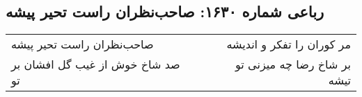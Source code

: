 \begin{center}
\section*{رباعی شماره ۱۶۳۰: صاحب‌نظران راست تحیر پیشه}
\label{sec:1630}
\begin{longtable}{l p{0.5cm} r}
صاحب‌نظران راست تحیر پیشه
&&
مر کوران را تفکر و اندیشه
\\
صد شاخ خوش از غیب گل افشان بر تو
&&
بر شاخ رضا چه میزنی تو تیشه
\\
\end{longtable}
\end{center}
